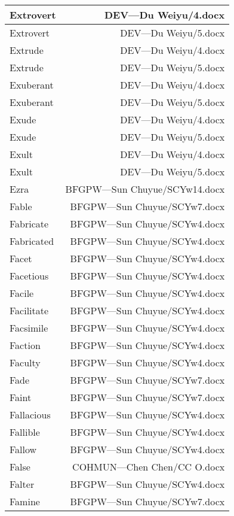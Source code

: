 \documentclass{article}
\begin{document}
\begin{center}
\begin{longtable}{|l|r|}
\hline
Extrovert  &  DEV---Du Weiyu/4.docx\\  
\hline
Extrovert  &  DEV---Du Weiyu/5.docx\\  
\hline
Extrude  &  DEV---Du Weiyu/4.docx\\  
\hline
Extrude  &  DEV---Du Weiyu/5.docx\\  
\hline
Exuberant  &  DEV---Du Weiyu/4.docx\\  
\hline
Exuberant  &  DEV---Du Weiyu/5.docx\\  
\hline
Exude  &  DEV---Du Weiyu/4.docx\\  
\hline
Exude  &  DEV---Du Weiyu/5.docx\\  
\hline
Exult  &  DEV---Du Weiyu/4.docx\\  
\hline
Exult  &  DEV---Du Weiyu/5.docx\\  
\hline
Ezra  &  BFGPW---Sun Chuyue/SCYw14.docx\\  
\hline
Fable  &  BFGPW---Sun Chuyue/SCYw7.docx\\  
\hline
Fabricate  &  BFGPW---Sun Chuyue/SCYw4.docx\\  
\hline
Fabricated  &  BFGPW---Sun Chuyue/SCYw4.docx\\  
\hline
Facet  &  BFGPW---Sun Chuyue/SCYw4.docx\\  
\hline
Facetious  &  BFGPW---Sun Chuyue/SCYw4.docx\\  
\hline
Facile  &  BFGPW---Sun Chuyue/SCYw4.docx\\  
\hline
Facilitate  &  BFGPW---Sun Chuyue/SCYw4.docx\\  
\hline
Facsimile  &  BFGPW---Sun Chuyue/SCYw4.docx\\  
\hline
Faction  &  BFGPW---Sun Chuyue/SCYw4.docx\\  
\hline
Faculty  &  BFGPW---Sun Chuyue/SCYw4.docx\\  
\hline
Fade  &  BFGPW---Sun Chuyue/SCYw7.docx\\  
\hline
Faint  &  BFGPW---Sun Chuyue/SCYw7.docx\\  
\hline
Fallacious  &  BFGPW---Sun Chuyue/SCYw4.docx\\  
\hline
Fallible  &  BFGPW---Sun Chuyue/SCYw4.docx\\  
\hline
Fallow  &  BFGPW---Sun Chuyue/SCYw4.docx\\  
\hline
False  &  COHMUN---Chen Chen/CC O.docx\\  
\hline
Falter  &  BFGPW---Sun Chuyue/SCYw4.docx\\  
\hline
Famine  &  BFGPW---Sun Chuyue/SCYw7.docx\\  

\end{longtable}
\end{center}
\end{document}
